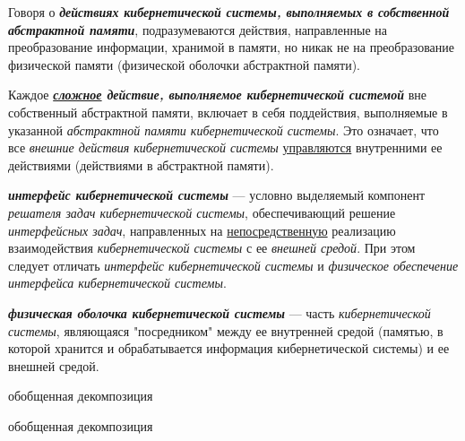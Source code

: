 Говоря о \textbf{\textit{действиях кибернетической системы, выполняемых в собственной абстрактной памяти}}, подразумеваются действия, направленные на преобразование информации, хранимой в памяти, но никак не на преобразование физической памяти (физической оболочки абстрактной памяти).

Каждое \textbf{\textit{\uline{сложное} действие, выполняемое кибернетической системой}} вне собственный абстрактной памяти, включает в себя поддействия, выполняемые в указанной \textit{абстрактной памяти кибернетической системы}. 
Это означает, что все \textit{внешние действия кибернетической системы} \uline{управляются} внутренними ее действиями (действиями в абстрактной памяти).


\textbf{\textit{интерфейс кибернетической системы}} --- условно выделяемый компонент \textit{решателя задач кибернетической системы}, обеспечивающий решение \textit{интерфейсных задач}, направленных на \uline{непосредственную} реализацию взаимодействия \textit{кибернетической системы} с ее \textit{внешней средой}. При этом следует отличать \textit{интерфейс кибернетической системы} и \textit{физическое обеспечение интерфейса кибернетической системы}.

\textbf{\textit{физическая оболочка кибернетической системы}} --- часть \textit{кибернетической системы}, являющаяся "посредником"{} между ее внутренней средой (памятью, в которой хранится и обрабатывается информация кибернетической системы) и ее внешней средой.

\begin{SCn}
	\begin{scnrelfromset}{обобщенная декомпозиция}
	\end{scnrelfromset}
\end{SCn}


\begin{SCn}
	\begin{scnrelfromset}{обобщенная декомпозиция}
	\end{scnrelfromset}
\end{SCn}

